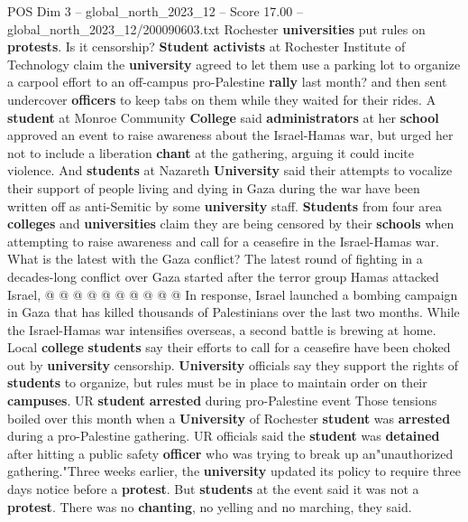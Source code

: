 \begin{textsample}{POS Dim 3 – global\_north\_2023\_12 – Score 17.00 – global\_north\_2023\_12/200090603.txt}  \label{ex:f3_pos_220}
Rochester \textbf{universities} put rules on \textbf{protests}.
Is it censorship? \textbf{Student} \textbf{activists} at Rochester Institute of Technology claim the \textbf{university} agreed to let them use a parking lot to organize a carpool effort to an off-campus pro-Palestine \textbf{rally} last month? and then sent undercover \textbf{officers} to keep tabs on them while they waited for their rides.
A \textbf{student} at Monroe Community \textbf{College} said \textbf{administrators} at her \textbf{school} approved an event to raise awareness about the Israel-Hamas war, but urged her not to include a liberation \textbf{chant} at the gathering, arguing it could incite violence.
And \textbf{students} at Nazareth \textbf{University} said their attempts to vocalize their support of people living and dying in Gaza during the war have been written off as anti-Semitic by some \textbf{university} staff. \textbf{Students} from four area \textbf{colleges} and \textbf{universities} claim they are being censored by their \textbf{schools} when attempting to raise awareness and call for a ceasefire in the Israel-Hamas war.
What is the latest with the Gaza conflict?
The latest round of fighting in a decades-long conflict over Gaza started after the terror group Hamas attacked Israel, @ @ @ @ @ @ @ @ @ @ In response, Israel launched a bombing campaign in Gaza that has killed thousands of Palestinians over the last two months.
While the Israel-Hamas war intensifies overseas, a second battle is brewing at home.
Local \textbf{college} \textbf{students} say their efforts to call for a ceasefire have been choked out by \textbf{university} censorship. \textbf{University} officials say they support the rights of \textbf{students} to organize, but rules must be in place to maintain order on their \textbf{campuses}.
UR \textbf{student} \textbf{arrested} during pro-Palestine event Those tensions boiled over this month when a \textbf{University} of Rochester \textbf{student} was \textbf{arrested} during a pro-Palestine gathering.
UR officials said the \textbf{student} was \textbf{detained} after hitting a public safety \textbf{officer} who was trying to break up an"unauthorized gathering."Three weeks earlier, the \textbf{university} updated its policy to require three days notice before a \textbf{protest}.
But \textbf{students} at the event said it was not a \textbf{protest}.
There was no \textbf{chanting}, no yelling and no marching, they said.

\end{textsample}
